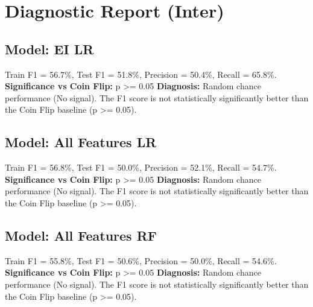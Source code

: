 \section*{Diagnostic Report (Inter)}
\subsection*{Model: EI LR}
Train F1 = 56.7\%, Test F1 = 51.8\%, Precision = 50.4\%, Recall = 65.8\%.
\newline
\textbf{Significance vs Coin Flip:} p >= 0.05
\newline
\textbf{Diagnosis:} Random chance performance (No signal). The F1 score is not statistically significantly better than the Coin Flip baseline (p >= 0.05).

\subsection*{Model: All Features LR}
Train F1 = 56.8\%, Test F1 = 50.0\%, Precision = 52.1\%, Recall = 54.7\%.
\newline
\textbf{Significance vs Coin Flip:} p >= 0.05
\newline
\textbf{Diagnosis:} Random chance performance (No signal). The F1 score is not statistically significantly better than the Coin Flip baseline (p >= 0.05).

\subsection*{Model: All Features RF}
Train F1 = 55.8\%, Test F1 = 50.6\%, Precision = 50.0\%, Recall = 54.6\%.
\newline
\textbf{Significance vs Coin Flip:} p >= 0.05
\newline
\textbf{Diagnosis:} Random chance performance (No signal). The F1 score is not statistically significantly better than the Coin Flip baseline (p >= 0.05).
